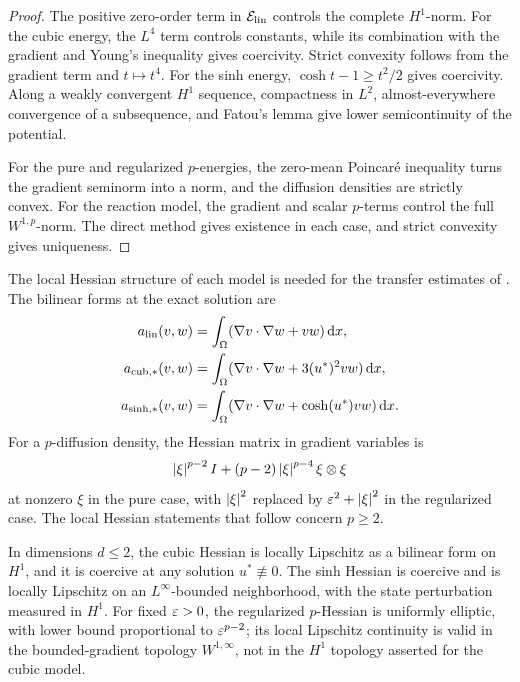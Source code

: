 \begin{proof}
The positive zero-order term in \(\mathcal{E}_{\rm lin}\) controls the complete \(H^1\)-norm. For the cubic
energy, the \(L^4\) term controls constants, while its combination with the gradient and Young's
inequality gives coercivity. Strict convexity follows from the gradient term and \(t\mapsto t^4\). For
the sinh energy, \(\cosh t-1\geq t^2/2\) gives coercivity. Along a weakly convergent \(H^1\) sequence,
compactness in \(L^2\), almost-everywhere convergence of a subsequence, and Fatou's lemma give lower
semicontinuity of the potential.

For the pure and regularized \(p\)-energies, the zero-mean Poincar\'e inequality turns the gradient
seminorm into a norm, and the diffusion densities are strictly convex. For the reaction model, the
gradient and scalar \(p\)-terms control the full \(W^{1,p}\)-norm. The direct method gives existence in
each case, and strict convexity gives uniqueness.
\end{proof}

The local Hessian structure of each model is needed for the transfer estimates of
. The bilinear forms at the exact solution are
\begin{align*}
 a_{\rm lin}(v,w)&=\int_\Omega(\nabla v\cdot\nabla w+vw)\,\mathrm{d} x,\\
 a_{\rm cub,*}(v,w)&=\int_\Omega(\nabla v\cdot\nabla w+3(u^*)^2vw)\,\mathrm{d} x,\\
 a_{\sinh,*}(v,w)&=\int_\Omega(\nabla v\cdot\nabla w+\cosh(u^*)vw)\,\mathrm{d} x.
\end{align*}
For a \(p\)-diffusion density, the Hessian matrix in gradient variables is
\[
 \left\lvert \xi\right\rvert^{p-2}I+(p-2)\left\lvert \xi\right\rvert^{p-4}\xi\otimes\xi
\]
at nonzero \(\xi\) in the pure case, with \(\left\lvert \xi\right\rvert^2\) replaced by
\(\varepsilon^2+\left\lvert \xi\right\rvert^2\) in the regularized case. The local Hessian statements that follow concern
\(p\geq2\).

\begin{proposition}
\label{prop:model-hessian}
In dimensions \(d\leq2\), the cubic Hessian is locally Lipschitz as a bilinear form on \(H^1\), and it
is coercive at any solution \(u^*\not\equiv0\). The sinh Hessian is coercive and is locally Lipschitz on
an \(L^\infty\)-bounded neighborhood, with the state perturbation measured in \(H^1\). For fixed
\(\varepsilon>0\), the regularized \(p\)-Hessian is uniformly elliptic, with lower bound proportional to
\(\varepsilon^{p-2}\); its local Lipschitz continuity is valid in the bounded-gradient topology
\(W^{1,\infty}\), not in the \(H^1\) topology asserted for the cubic model.
\end{proposition}

